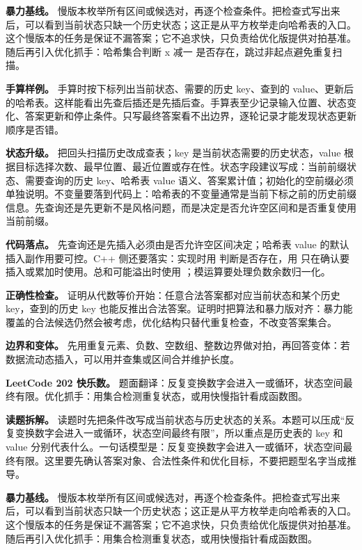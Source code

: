\textbf{暴力基线。} 慢版本枚举所有区间或候选对，再逐个检查条件。把检查式写出来后，可以看到当前状态只缺一个历史状态；这正是从平方枚举走向哈希表的入口。这个慢版本的任务是保证不漏答案；它不追求快，只负责给优化版提供对拍基准。随后再引入优化抓手：哈希集合判断 x 减一 是否存在，跳过非起点避免重复扫描。

\textbf{手算样例。} 手算时按下标列出当前状态、需要的历史 key、查到的 value、更新后的哈希表。这样能看出先查后插还是先插后查。手算表至少记录输入位置、状态变化、答案更新和停止条件。只写最终答案看不出边界，逐轮记录才能发现状态更新顺序是否错。

\textbf{状态升级。} 把回头扫描历史改成查表；key 是当前状态需要的历史状态，value 根据目标选择次数、最早位置、最近位置或存在性。状态字段建议写成：当前前缀状态、需要查询的历史 key、哈希表 value 语义、答案累计值；初始化的空前缀必须单独说明。不变量要落到代码上：哈希表的不变量通常是当前下标之前的历史前缀信息。先查询还是先更新不是风格问题，而是决定是否允许空区间和是否重复使用当前前缀。

\textbf{代码落点。} 先查询还是先插入必须由是否允许空区间决定；哈希表 value 的默认插入副作用要可控。C++ 侧还要落实：实现时用  判断是否存在，用  只在确认要插入或累加时使用。总和可能溢出时使用 ；模运算要处理负数余数归一化。

\textbf{正确性检查。} 证明从代数等价开始：任意合法答案都对应当前状态和某个历史 key，查到的历史 key 也能反推出合法答案。证明时把算法和暴力版对齐：暴力能覆盖的合法候选仍然会被考虑，优化结构只替代重复检查，不改变答案集合。

\textbf{边界和变体。} 先用重复元素、负数、空数组、整数边界做对拍，再回答变体：若数据流动态插入，可以用并查集或区间合并维护长度。

\noindent\textbf{LeetCode 202 快乐数。} 题面翻译：反复变换数字会进入一或循环，状态空间最终有限。优化抓手：用集合检测重复状态，或用快慢指针看成函数图。

\textbf{读题拆解。} 读题时先把条件改写成当前状态与历史状态的关系。本题可以压成“反复变换数字会进入一或循环，状态空间最终有限”，所以重点是历史表的 key 和 value 分别代表什么。一句话模型是：反复变换数字会进入一或循环，状态空间最终有限。这里要先确认答案对象、合法性条件和优化目标，不要把题型名字当成推导。

\textbf{暴力基线。} 慢版本枚举所有区间或候选对，再逐个检查条件。把检查式写出来后，可以看到当前状态只缺一个历史状态；这正是从平方枚举走向哈希表的入口。这个慢版本的任务是保证不漏答案；它不追求快，只负责给优化版提供对拍基准。随后再引入优化抓手：用集合检测重复状态，或用快慢指针看成函数图。

